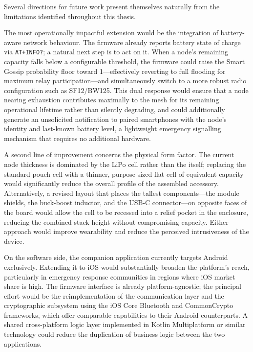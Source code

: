 \documentclass[english,bachelor]{tfgitic}[2026/01/22]
\begin{document}
Several directions for future work present themselves naturally from the limitations identified throughout this thesis.

The most operationally impactful extension would be the integration of battery-aware network behaviour. The firmware already reports battery state of charge via \texttt{AT+INFO?}; a natural next step is to act on it. When a node's remaining capacity falls below a configurable threshold, the firmware could raise the Smart Gossip probability floor toward 1---effectively reverting to full flooding for maximum relay participation---and simultaneously switch to a more robust radio configuration such as SF12/BW125. This dual response would ensure that a node nearing exhaustion contributes maximally to the mesh for its remaining operational lifetime rather than silently degrading, and could additionally generate an unsolicited  notification to paired smartphones with the node's identity and last-known battery level, a lightweight emergency signalling mechanism that requires no additional hardware.

A second line of improvement concerns the physical form factor. The current node thickness is dominated by the LiPo cell rather than the  itself; replacing the standard pouch cell with a thinner, purpose-sized flat cell of equivalent capacity would significantly reduce the overall profile of the assembled accessory. Alternatively, a revised  layout that places the tallest components---the module shields, the buck-boost inductor, and the USB-C connector---on opposite faces of the board would allow the cell to be recessed into a relief pocket in the enclosure, reducing the combined stack height without compromising capacity. Either approach would improve wearability and reduce the perceived intrusiveness of the device.

On the software side, the companion application currently targets Android exclusively. Extending it to iOS would substantially broaden the platform's reach, particularly in emergency response communities in regions where iOS market share is high. The firmware  interface is already platform-agnostic; the principal effort would be the reimplementation of the  communication layer and the cryptographic subsystem using the iOS Core Bluetooth and CommonCrypto frameworks, which offer comparable capabilities to their Android counterparts. A shared cross-platform logic layer implemented in Kotlin Multiplatform or similar technology could reduce the duplication of business logic between the two applications.
\end{document}

